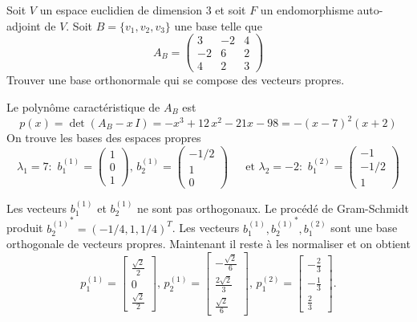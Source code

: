 \begin{example}
  \label{exe:17}
  Soit $V$ un espace euclidien de dimension $3$ et soit $F$ un endomorphisme auto-adjoint de $V$. Soit $B=\{v_1,v_2,v_3\}$ une base telle que 
  \begin{displaymath}
    A_B =
    \begin{pmatrix}
      3 & -2 & 4\\-2 & 6 & 2\\4 & 2 & 3
    \end{pmatrix}
  \end{displaymath}
Trouver une base orthonormale qui se compose des vecteurs propres. 


\bigskip 

Le polynôme caractéristique de $A_B$ est 
\begin{displaymath}
  p(x) = \det(A_B - x\, I) =  -x^3 + 12\, x^2 -21 x - 98 = -(x-7)^2(x+2)
\end{displaymath}
On trouve les bases des espaces propres
\begin{displaymath}
  \lambda_1 = 7: \, \,
b_1^{(1)} = \begin{pmatrix}
    1 \\ 0 \\ 1 
  \end{pmatrix}, \, 
b_2^{(1)} =   \begin{pmatrix}
    -1/2\\1\\0
  \end{pmatrix} \, \quad \text{ et } 
  \lambda_2 = -2: \, \, 
  b_1^{(2)} = 
  \begin{pmatrix}
    -1 \\ -1/2 \\1
  \end{pmatrix}  
\end{displaymath}

Les vecteurs $b_1^{(1)}$
et $b_2^{(1)}$
ne sont pas orthogonaux.  Le procédé de Gram-Schmidt produit
${b_2^{(1)}}^* = (-1/4,1,1/4)^T$.
Les vecteurs $b_1^{(1)},{b_2^{(1)}}^*,b_1^{(2)}$
sont une base orthogonale de vecteurs propres. Maintenant il reste à
les normaliser et on obtient
\begin{displaymath}
p_1^{(1)} = 
\left[\begin{matrix}\frac{\sqrt{2}}{2}\\0\\\frac{\sqrt{2}}{2}\end{matrix}\right], \, 
{p_2^{(1)}} = \left[\begin{matrix}- \frac{\sqrt{2}}{6}\\\frac{2 \sqrt{2}}{3}\\\frac{\sqrt{2}}{6}\end{matrix}\right], \, 
p_1^{(2)} = \left[\begin{matrix}-\frac{2}{3}\\-\frac{1}{3}\\\frac{2}{3}\end{matrix}\right]. 
\end{displaymath}


\end{example}
